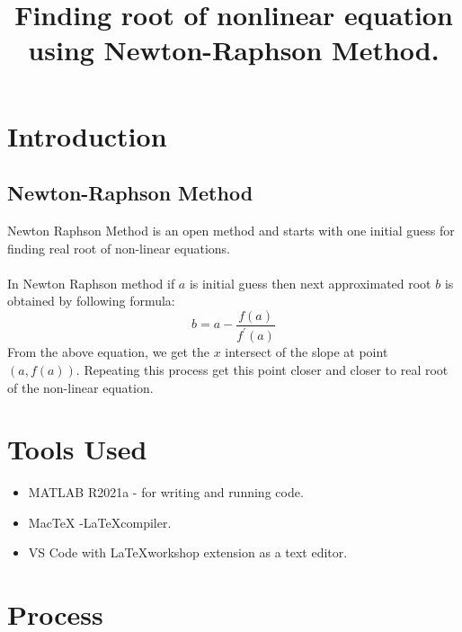 \clearpage
\title{Finding root of nonlinear equation using Newton-Raphson Method.}
\author{}
\date{}
\maketitle

\section*{Introduction}

\subsection*{Newton-Raphson Method}
Newton Raphson Method is an open method and starts with one initial guess for finding real root of non-linear equations.\\\\
In Newton Raphson method if $a$ is initial guess then next approximated root $b$ is obtained by following formula:
\[b = a - \frac{f(a)}{f^\prime(a)}\]
From the above equation, we get the $x$ intersect of the slope at point $(a, f(a))$. Repeating this process get this point closer and closer to real root of the non-linear equation.\cite{prs}

\section*{Tools Used}
\begin{itemize}
    \item MATLAB R2021a - for writing and running code.
    \item MacTeX -\LaTeX  compiler.
    \item VS Code with \LaTeX workshop extension as a text editor.
\end{itemize}

\section*{Process}

